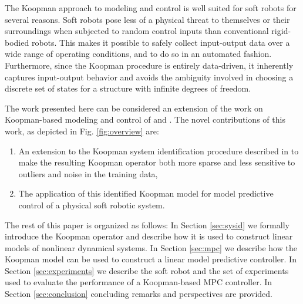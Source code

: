 The Koopman approach to modeling and control is well suited for soft robots for several reasons.
Soft robots pose less of a physical threat to themselves or their surroundings when subjected to random control inputs than conventional rigid-bodied robots. 
This makes it possible to safely collect input-output data over a wide range of operating conditions, and to do so in an automated fashion. 
Furthermore, since the Koopman procedure is entirely data-driven, it inherently captures input-output behavior and avoids the ambiguity involved in choosing a discrete set of states for a structure with infinite degrees of freedom.

The work presented here can be considered an extension of the work on Koopman-based modeling and control of \citet{mauroy2016linear} and \citet{korda2018linear}.
The novel contributions of this work, as depicted in Fig. \ref{fig:overview} are:
\begin{enumerate}
    \item An extension to the Koopman system identification procedure described in \cite{mauroy2016linear} to make the resulting Koopman operator both more sparse and less sensitive to outliers and noise in the training data,
    \item The application of this identified Koopman model for model predictive control of a physical soft robotic system.
\end{enumerate}




The rest of this paper is organized as follows:
In Section \ref{sec:sysid} we formally introduce the Koopman operator and describe how it is used to construct linear models of nonlinear dynamical systems. 
In Section \ref{sec:mpc} we describe how the Koopman model can be used to construct a linear model predictive controller.
In Section \ref{sec:experiments} we describe the soft robot and the set of experiments used to evaluate the performance of a Koopman-based MPC controller.
In Section \ref{sec:conclusion} concluding remarks and perspectives are provided.
